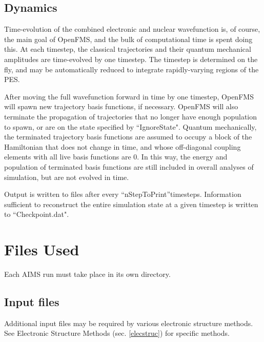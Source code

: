 \documentclass[11pt]{article}
\begin{document}
\subsection{Dynamics}
\label{dyn}

Time-evolution of the combined electronic and nuclear wavefunction is, of course, the main goal of OpenFMS, and the bulk of computational time is spent doing this. At each timestep, the classical trajectories and their quantum mechanical amplitudes are time-evolved by one timestep. The timestep is determined on the fly, and may be automatically reduced to integrate rapidly-varying regions of the PES.

After moving the full wavefunction forward in time by one timestep, OpenFMS will spawn new trajectory basis functions, if necessary. OpenFMS will also terminate the propagation of trajectories that no longer have enough population to spawn, or are on the state specified by ``IgnoreState". Quantum mechanically, the terminated trajectory basis functions are assumed to occupy a block of the Hamiltonian that does not change in time, and whose off-diagonal coupling elements with all live basis functions are 0. In this way, the energy and population of terminated basis functions are still included in overall analyses of simulation, but are not evolved in time.

Output is written to files after every ``nStepToPrint''timesteps. Information sufficient to reconstruct the entire simulation state at a given timestep is written to ``Checkpoint.dat".






\newpage \section{Files Used}
\label{files} 

Each AIMS run must take place in its own directory.

\subsection{Input files}
\label{inputfiles} 

Additional input files may be required by various electronic structure methods. See Electronic Structure Methods  (sec. \ref{elecstruc}) for specific methods.
\end{document}
